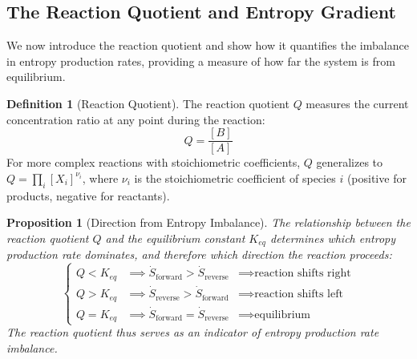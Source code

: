 \documentclass[12pt,a4paper]{article}
\newtheorem{proposition}[theorem]{Proposition}
\theoremstyle{definition}
\newtheorem{definition}[theorem]{Definition}
\theoremstyle{remark}
\begin{document}
\subsection{The Reaction Quotient and Entropy Gradient}

We now introduce the reaction quotient and show how it quantifies the imbalance in entropy production rates, providing a measure of how far the system is from equilibrium.

\begin{definition}[Reaction Quotient]
\label{def:reaction_quotient}
The reaction quotient $Q$ measures the current concentration ratio at any point during the reaction:
\begin{equation}
Q = \frac{[B]}{[A]}
\label{eq:reaction_quotient}
\end{equation}
For more complex reactions with stoichiometric coefficients, $Q$ generalizes to $Q = \prod_i [X_i]^{\nu_i}$, where $\nu_i$ is the stoichiometric coefficient of species $i$ (positive for products, negative for reactants).
\end{definition}

\begin{proposition}[Direction from Entropy Imbalance]
\label{prop:q_direction}
The relationship between the reaction quotient $Q$ and the equilibrium constant $K_{eq}$ determines which entropy production rate dominates, and therefore which direction the reaction proceeds:
\begin{equation}
\begin{cases}
Q < K_{eq} & \implies \dot{S}_{\text{forward}} > \dot{S}_{\text{reverse}} & \implies \text{reaction shifts right} \\
Q > K_{eq} & \implies \dot{S}_{\text{reverse}} > \dot{S}_{\text{forward}} & \implies \text{reaction shifts left} \\
Q = K_{eq} & \implies \dot{S}_{\text{forward}} = \dot{S}_{\text{reverse}} & \implies \text{equilibrium}
\end{cases}
\label{eq:q_direction}
\end{equation}
The reaction quotient thus serves as an indicator of entropy production rate imbalance.
\end{proposition}
\end{document}
